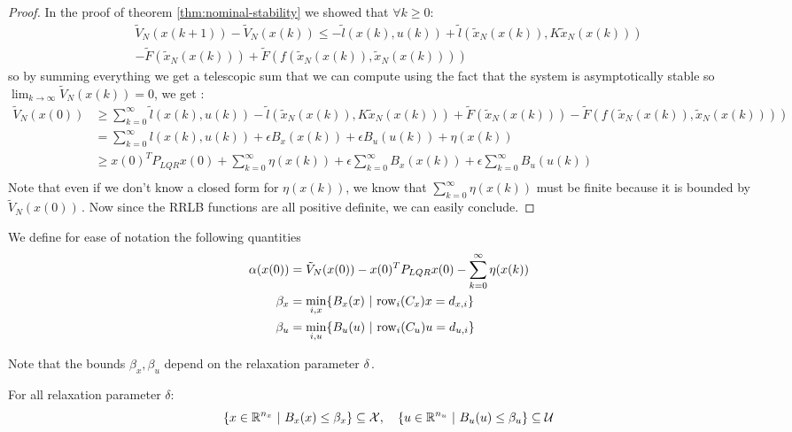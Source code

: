 \documentclass[12pt]{article}
\begin{document}
\begin{proof}
	In the proof of theorem \ref{thm:nominal-stability} we showed that $\forall k\geq 0$:
	\begin{multline*}
		\tilde{V}_N(x(k+1))-\tilde{V}_N(x(k))\leq-\tilde{l}(x(k),u(k))+\tilde{l}(\tilde{x}_N(x(k)), K\tilde{x}_N(x(k)))\\
		-\tilde{F}(\tilde{x}_N(x(k)))+\tilde{F}(f(\tilde{x}_N(x(k)),\tilde{x}_N(x(k))))
	\end{multline*}
	so by summing everything we get a telescopic sum that we can compute using the fact that the system is asymptotically stable so $\lim_{k\to\infty}\tilde{V}_N(x(k))=0$, we get :
	\begin{align*}
		\tilde{V}_N(x(0))&\geq\sum_{k=0}^\infty\tilde{l}(x(k),u(k))-\tilde{l}(\tilde{x}_N(x(k)), K\tilde{x}_N(x(k)))+\tilde{F}(\tilde{x}_N(x(k)))-\tilde{F}(f(\tilde{x}_N(x(k)),\tilde{x}_N(x(k))))\\
		&=\sum_{k=0}^\infty l(x(k), u(k))+\epsilon B_x(x(k))+\epsilon B_u(u(k))+\eta(x(k))\\
		&\geq x(0)^TP_{LQR}x(0)+\sum_{k=0}^\infty\eta(x(k))+\epsilon\sum_{k=0}^\infty B_x(x(k))+\epsilon\sum_{k=0}^\infty B_u(u(k))\\
	\end{align*}
	Note that even if we don't know a closed form for $\eta(x(k))$, we know that $\sum_{k=0}^\infty\eta(x(k))$ must be finite because it is bounded by $\tilde{V}_N(x(0))$\,.
	Now since the RRLB functions are all positive definite, we can easily conclude.
\end{proof}

We define for ease of notation the following quantities
\begin{align*}
	\alpha(x(0))&=\tilde{V}_N(x(0))-x(0)^TP_{LQR}x(0)-\sum_{k=0}^\infty\eta(x(k))\\
	\beta_x&=\underset{i,x}{\min}\{B_x(x)~|~\rm{row}_i(C_x)x=d_{x,i}\}\\
	\beta_u&=\underset{i,u}{\min}\{B_u(u)~|~\rm{row}_i(C_u)u=d_{u,i}\}
\end{align*}

Note that the bounds $\beta_x,\beta_u$ depend on the relaxation parameter $\delta$\,.

\begin{lemma}
	\label{thm:constraint-set-def-with-RRLB}
	For all relaxation parameter $\delta$:
	$$\left\{x\in\R^{n_x}~|~B_x(x)\leq\beta_x\right\}\subseteq\cal{X},\quad\left\{u\in\R^{n_u}~|~B_u(u)\leq\beta_u\right\}\subseteq\cal{U}$$
\end{lemma}
\end{document}

